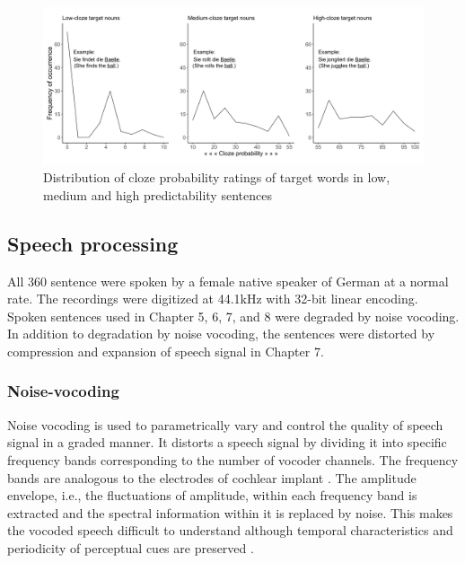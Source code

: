 \documentclass[a4paper, nobind]{templates/ociamthesis}
\begin{document}
\begin{figure}

{\centering \includegraphics[width=0.9\linewidth]{figures/materials/cloze-distribution} 

}

\caption{Distribution of cloze probability ratings of target words in low, medium and high predictability sentences}\label{fig:cloze-distribution}
\end{figure}

\hypertarget{speech-processing}{%
\subsection{Speech processing}\label{speech-processing}}

All 360 sentence were spoken by a female native speaker of German at a normal rate.
The recordings were digitized at 44.1kHz with 32-bit linear encoding.
Spoken sentences used in Chapter 5, 6, 7, and 8 were degraded by noise vocoding.
In addition to degradation by noise vocoding, the sentences were distorted by compression and expansion of speech signal in Chapter 7.

\hypertarget{noise-vocoding}{%
\subsubsection{Noise-vocoding}\label{noise-vocoding}}

Noise vocoding is used to parametrically vary and control the quality of speech signal in a graded manner.
It distorts a speech signal by dividing it into specific frequency bands corresponding to the number of vocoder channels.
The frequency bands are analogous to the electrodes of cochlear implant \autocite{Shannon1995,Loizou1999,Shannon2004}.
The amplitude envelope, i.e., the fluctuations of amplitude, within each frequency band is extracted and the spectral information within it is replaced by noise.
This makes the vocoded speech difficult to understand although temporal characteristics and periodicity of perceptual cues are preserved \autocite{Rosen1999}.
\end{document}
